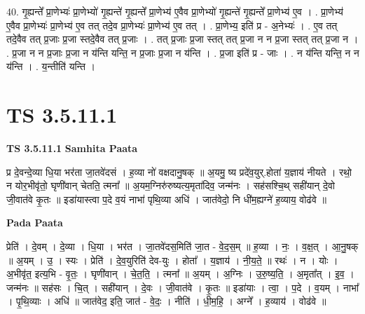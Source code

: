 \documentclass[17pt]{extarticle}
\begin{document}
40. गृ॒ह्यन्ते᳚ प्रा॒णेभ्यः॑ प्रा॒णेभ्यो॑ गृ॒ह्यन्ते॑ गृ॒ह्यन्ते᳚ प्रा॒णेभ्य॑ ए॒वैव प्रा॒णेभ्यो॑ गृ॒ह्यन्ते॑ गृ॒ह्यन्ते᳚ प्रा॒णेभ्य॑ ए॒व । . प्रा॒णेभ्य॑ ए॒वैव प्रा॒णेभ्यः॑ प्रा॒णेभ्य॑ ए॒व तत् तदे॒व प्रा॒णेभ्यः॑ प्रा॒णेभ्य॑ ए॒व तत् । . प्रा॒णेभ्य॒ इति॑ प्र - अ॒नेभ्यः॑ । . ए॒व तत् तदे॒वैव तत् प्र॒जाः प्र॒जा स्तदे॒वैव तत् प्र॒जाः । . तत् प्र॒जाः प्र॒जा स्तत् तत् प्र॒जा न न प्र॒जा स्तत् तत् प्र॒जा न । . प्र॒जा न न प्र॒जाः प्र॒जा न य॑न्ति यन्ति॒ न प्र॒जाः प्र॒जा न य॑न्ति । . प्र॒जा इति॑ प्र - जाः । . न य॑न्ति यन्ति॒ न न य॑न्ति । . य॒न्तीति॑ यन्ति । \newline
\pagebreak
{}

\section{ TS 3.5.11.1 }

\textbf{TS 3.5.11.1 } \newline
\textbf{Samhita Paata} \newline

प्र दे॒वन्दे॒व्या धि॒या भर॑ता जा॒तवे॑दसं । ह॒व्या नो॑ वक्षदानु॒षक् ॥ अ॒यमु॒ ष्य प्रदे॑व॒युर्.होता॑ य॒ज्ञाय॑ नीयते । रथो॒ न योर॒भीवृ॑तो॒ घृणी॑वान् चेतति॒ त्मना᳚ ॥ अ॒यम॒ग्निरु॑रुष्यत्य॒मृता॑दिव॒ जन्म॑नः । सह॑सश्चि॒थ् सही॑यान् दे॒वो जी॒वात॑वे कृ॒तः ॥ इडा॑यास्त्वा प॒दे व॒यं नाभा॑ पृथि॒व्या अधि॑ । जात॑वेदो॒ नि धी॑म॒ह्यग्ने॑ ह॒व्याय॒ वोढ॑वे ॥ \newline

\textbf{Pada Paata} \newline

प्रेति॑ । दे॒वम् । दे॒व्या । धि॒या । भर॑त । जा॒तवे॑दस॒मिति॑ जा॒त - वे॒द॒स॒म् ॥ ह॒व्या । नः॒ । व॒क्ष॒त् । आ॒नु॒षक् ॥ अ॒यम् । उ॒ । स्यः । प्रेति॑ । दे॒व॒युरिति॑ देव-युः । होता᳚ । य॒ज्ञाय॑ । नी॒य॒ते॒ ॥ रथः॑ । न । योः । अ॒भीवृ॑त॒ इत्य॒भि - वृ॒तः॒ । घृणी॑वान् । चे॒त॒ति॒ । त्मना᳚ ॥ अ॒यम् । अ॒ग्निः । उ॒रु॒ष्य॒ति॒ । अ॒मृता᳚त् । इ॒व॒ । जन्म॑नः ॥ सह॑सः । चि॒त् । सही॑यान् । दे॒वः । जी॒वात॑वे । कृ॒तः ॥ इडा॑याः । त्वा॒ । प॒दे । व॒यम् । नाभा᳚ । पृ॒थि॒व्याः । अधि॑ ॥ जात॑वेद॒ इति॒ जात॑ - वे॒दः॒ । नीति॑ । धी॒म॒हि॒ । अग्ने᳚ । ह॒व्याय॑ । वोढ॑वे ॥  \newline
\end{document}
